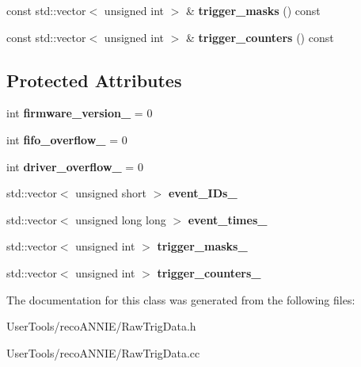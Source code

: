 \begin{DoxyCompactItemize}
\item 
\hypertarget{classannie_1_1RawTrigData_afac7b8b1f6de24e63d09964b8d2eac78}{const std\-::vector$<$ unsigned int $>$ \& {\bfseries trigger\-\_\-masks} () const }\label{classannie_1_1RawTrigData_afac7b8b1f6de24e63d09964b8d2eac78}

\item 
\hypertarget{classannie_1_1RawTrigData_a3ae5db26f422e0b8bc4fb702e1017fc1}{const std\-::vector$<$ unsigned int $>$ \& {\bfseries trigger\-\_\-counters} () const }\label{classannie_1_1RawTrigData_a3ae5db26f422e0b8bc4fb702e1017fc1}

\end{DoxyCompactItemize}
\subsection*{Protected Attributes}
\begin{DoxyCompactItemize}
\item 
\hypertarget{classannie_1_1RawTrigData_af40ecbe0420f8bc6e91d3f6e8f8c5217}{int {\bfseries firmware\-\_\-version\-\_\-} = 0}\label{classannie_1_1RawTrigData_af40ecbe0420f8bc6e91d3f6e8f8c5217}

\item 
\hypertarget{classannie_1_1RawTrigData_ab5fe9735027e327199ca1b691bf02505}{int {\bfseries fifo\-\_\-overflow\-\_\-} = 0}\label{classannie_1_1RawTrigData_ab5fe9735027e327199ca1b691bf02505}

\item 
\hypertarget{classannie_1_1RawTrigData_a157b3599c9ea6b8c1b49c9a0a6df553d}{int {\bfseries driver\-\_\-overflow\-\_\-} = 0}\label{classannie_1_1RawTrigData_a157b3599c9ea6b8c1b49c9a0a6df553d}

\item 
\hypertarget{classannie_1_1RawTrigData_a8393681826fec79124840fe25d0407c7}{std\-::vector$<$ unsigned short $>$ {\bfseries event\-\_\-\-I\-Ds\-\_\-}}\label{classannie_1_1RawTrigData_a8393681826fec79124840fe25d0407c7}

\item 
\hypertarget{classannie_1_1RawTrigData_a0de9cca76c8ffdf0cc7e0359f4fdba69}{std\-::vector$<$ unsigned long long $>$ {\bfseries event\-\_\-times\-\_\-}}\label{classannie_1_1RawTrigData_a0de9cca76c8ffdf0cc7e0359f4fdba69}

\item 
\hypertarget{classannie_1_1RawTrigData_a415d54d089f663f6fd5fd38e2ee5dfdb}{std\-::vector$<$ unsigned int $>$ {\bfseries trigger\-\_\-masks\-\_\-}}\label{classannie_1_1RawTrigData_a415d54d089f663f6fd5fd38e2ee5dfdb}

\item 
\hypertarget{classannie_1_1RawTrigData_a7e7333a790cce96d233b670e4bb085cb}{std\-::vector$<$ unsigned int $>$ {\bfseries trigger\-\_\-counters\-\_\-}}\label{classannie_1_1RawTrigData_a7e7333a790cce96d233b670e4bb085cb}

\end{DoxyCompactItemize}


The documentation for this class was generated from the following files\-:\begin{DoxyCompactItemize}
\item 
User\-Tools/reco\-A\-N\-N\-I\-E/Raw\-Trig\-Data.\-h\item 
User\-Tools/reco\-A\-N\-N\-I\-E/Raw\-Trig\-Data.\-cc\end{DoxyCompactItemize}
